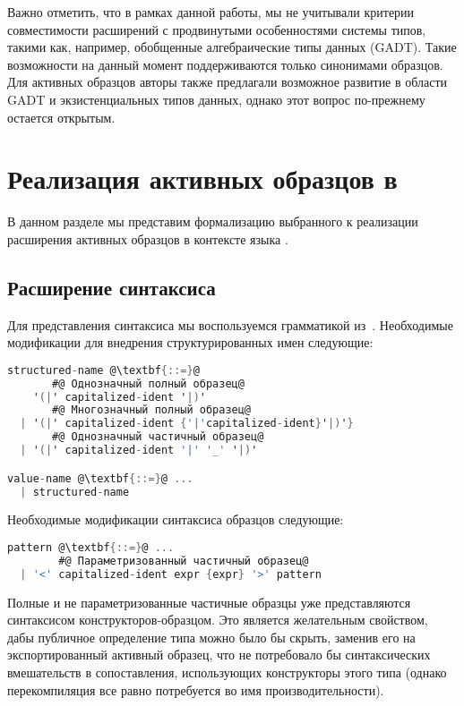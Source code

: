 Важно отметить, что в рамках данной работы, мы не учитывали критерии совместимости расширений с продвинутыми особенностями системы типов, такими как, например, обобщенные алгебраические типы данных (GADT). Такие возможности на данный момент поддерживаются только синонимами образцов. Для активных образцов авторы также предлагали возможное развитие в области GADT и экзистенциальных типов данных, однако этот вопрос по-прежнему остается открытым. 

\section{Реализация активных образцов в \OCaml}

В данном разделе мы представим формализацию выбранного к реализации расширения активных образцов в контексте языка \OCaml.

\subsection{Расширение синтаксиса}

Для представления синтаксиса мы воспользуемся грамматикой из~\cite{leroy2019manual}. Необходимые модификации для внедрения структурированных имен следующие:

\noindent
\begin{minipage}{\linewidth}
\begin{lstlisting}[language=C,escapechar=@] 
structured-name @\textbf{::=}@
       #@ Однозначный полный образец@
    '(|' capitalized-ident '|)'
       #@ Многозначный полный образец@
  | '(|' capitalized-ident {'|'capitalized-ident}'|)'}
       #@ Однозначный частичный образец@
  | '(|' capitalized-ident '|' '_' '|)'

value-name @\textbf{::=}@ ... 
  | structured-name 
\end{lstlisting}
\end{minipage}

Необходимые модификации синтаксиса образцов следующие:

\noindent
\begin{minipage}{\linewidth}
\begin{lstlisting}[language=C,escapechar=@] 
pattern @\textbf{::=}@ ...
        #@ Параметризованный частичный образец@
  | '<' capitalized-ident expr {expr} '>' pattern
\end{lstlisting}
\end{minipage}

Полные и не параметризованные частичные образцы уже представляются синтаксисом конструкторов-образцом. Это является желательным свойством, дабы публичное определение типа можно было бы скрыть, заменив его на экспортированный активный образец, что не потребовало бы  синтаксических вмешательств в сопоставления, использующих конструкторы этого типа (однако перекомпиляция все равно потребуется во имя производительности).

